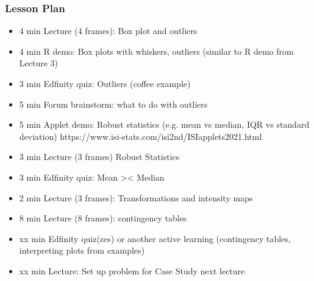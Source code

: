 \begin{frame}
    \frametitle{Lesson Plan}
    \begin{itemize}
        \item 4 min Lecture (4 frames): Box plot and outliers
        \item 4 min R demo: Box plots with whiskers, outliers (similar to R demo from Lecture 3)
        \item 3 min Edfinity quiz: Outliers (coffee example)
        \item 5 min Forum brainstorm: what to do with outliers
        \item 5 min Applet demo: Robust statistics (e.g. mean vs median, IQR vs standard deviation) https://www.isi-stats.com/isi2nd/ISIapplets2021.html
        \item 3 min Lecture (3 frames) Robust Statistics 
        \item 3 min Edfinity quiz: Mean >< Median
        \item 2 min Lecture (3 frames): Transformations and intensity maps
        \item 8 min Lecture (8 frames): contingency tables
        \item xx min Edfinity quiz(zes) or another active learning (contingency tables, interpreting plots from examples)
        \item xx min Lecture: Set up problem for Case Study next lecture
    \end{itemize}
\end{frame}


